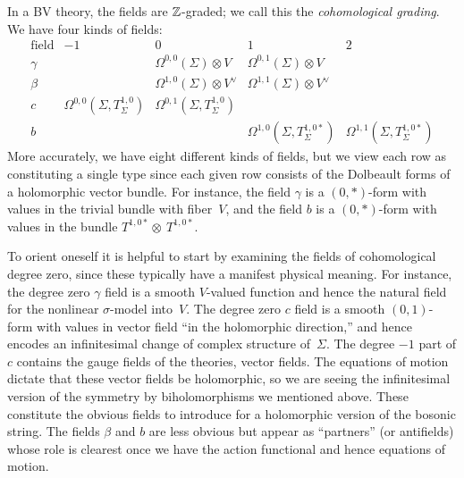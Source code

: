 In a BV theory, the fields are $\mathbb Z$-graded;
we call this the {\em cohomological grading}.
We have four kinds of fields:
\[
\begin{array}{ccccc}
\text{field} & -1 & 0 & 1 & 2\\
\hline
\gamma & & \Omega^{0,0}(\Sigma) \otimes V & \Omega^{0,1}(\Sigma) \otimes V & \\
\beta & & \Omega^{1,0}(\Sigma) \otimes V^\vee & \Omega^{1,1}(\Sigma) \otimes V^\vee & \\
c & \Omega^{0,0}(\Sigma, T^{1,0}_\Sigma) & \Omega^{0,1}(\Sigma, T^{1,0}_\Sigma) & \\
b & & & \Omega^{1,0}(\Sigma, T^{1,0 *}_\Sigma) & \Omega^{1,1}(\Sigma, T^{1,0 *}_\Sigma)
\end{array}
\]
More accurately, we have eight different kinds of fields, 
but we view each row as constituting a single type 
since each given row consists of the Dolbeault forms of a holomorphic vector bundle.
For instance, the field $\gamma$ is a $(0,*)$-form with values in the trivial bundle with fiber~$V$,
and the field $b$ is a $(0,*)$-form with values in the bundle $T^{1,0 *} \otimes~T^{1,0 *}$.

To orient oneself it is helpful to start by examining the fields of cohomological degree zero,
since these typically have a manifest physical meaning.
For instance, the degree zero $\gamma$ field is a smooth $V$-valued function
and hence the natural field for the nonlinear $\sigma$-model into~$V$.
The degree zero $c$ field is a smooth $(0,1)$-form with values in vector field ``in the holomorphic direction,''
and hence encodes an infinitesimal change of complex structure of~$\Sigma$.
The degree $-1$ part of $c$ contains the gauge fields of the theories, vector fields. 
The equations of motion dictate that these vector fields be holomorphic, so we are seeing the infinitesimal version of the symmetry by biholomorphisms we mentioned above.
These constitute the obvious fields to introduce for a holomorphic version of the bosonic string.
The fields $\beta$ and $b$ are less obvious but appear as ``partners'' (or antifields)
whose role is clearest once we have the action functional and hence equations of motion.

